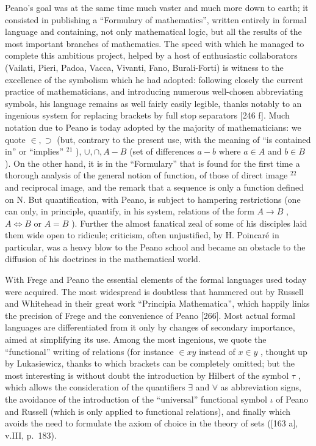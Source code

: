 Peano's goal was at the same time much vaster and much more down to earth; it consisted in publishing a ``Formulary of mathematics'', written entirely in formal language and containing, not only mathematical logic, but all the results of the most important branches of mathematics. The speed with which he managed to complete this ambitious project, helped by a host of enthusiastic collaborators (Vailati, Pieri, Padoa, Vacca, Vivanti, Fano, Burali-Forti) is witness to the excellence of the symbolism which he had adopted: following closely the current practice of mathematicians, and introducing numerous well-chosen abbreviating symbols, his language remains as well fairly easily legible, thanks notably to an ingenious system for replacing brackets by full stop separators {[}246 f{]}. Much notation due to Peano is today adopted by the majority of mathematicians: we quote \(\in, \supset\) (but, contrary to the present use, with the meaning of ``is contained in'' or ``implies'' \(^{21}\) ), \(\cup, \cap, A - B\) (set of differences \(a - b\) where \(a \in A\) and \(b \in B\) ). On the other hand, it is in the ``Formulary'' that is found for the first time a thorough analysis of the general notion of function, of those of direct image \(^{22}\) and reciprocal image, and the remark that a sequence is only a function defined on N. But quantification, with Peano, is subject to hampering restrictions (one can only, in principle, quantify, in his system, relations of the form \(A \to B\) , \(A \Leftrightarrow B\) or \(A = B\) ). Further the almost fanatical zeal of some of his disciples laid them wide open to ridicule; criticism, often unjustified, by H. Poincaré in particular, was a heavy blow to the Peano school and became an obstacle to the diffusion of his doctrines in the mathematical world.

With Frege and Peano the essential elements of the formal languages used today were acquired. The most widespread is doubtless that hammered out by Russell and Whitehead in their great work ``Principia Mathematica'', which happily links the precision of Frege and the convenience of Peano {[}266{]}. Most actual formal languages are differentiated from it only by changes of secondary importance, aimed at simplifying its use. Among the most ingenious, we quote the ``functional'' writing of relations (for instance \(\in xy\) instead of \(x \in y\) , thought up by Lukasiewicz, thanks to which brackets can be completely omitted; but the most interesting is without doubt the introduction by Hilbert of the symbol \(\tau\) , which allows the consideration of the quantifiers \(\exists\) and \(\forall\) as abbreviation signs, the avoidance of the introduction of the ``universal'' functional symbol \(\iota\) of Peano and Russell (which is only applied to functional relations), and finally which avoids the need to formulate the axiom of choice in the theory of sets ({[}163 a{]}, v.III, p.~183).

